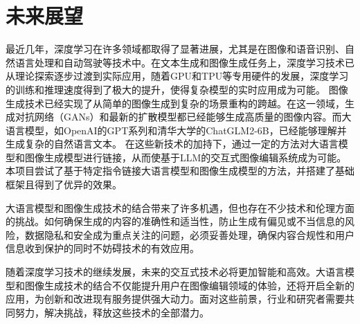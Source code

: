 \documentclass[a4paper,AutoFakeBold,oneside,12pt]{book}
\begin{document}
\section{未来展望}
最近几年，深度学习在许多领域都取得了显著进展，尤其是在图像和语音识别、自然语言处理和自动驾驶等技术中。在文本生成和图像生成任务上，深度学习技术已从理论探索逐步过渡到实际应用，随着GPU和TPU等专用硬件的发展，深度学习的训练和推理速度得到了极大的提升，使得复杂模型的实时应用成为可能。
图像生成技术已经实现了从简单的图像生成到复杂的场景重构的跨越。在这一领域，生成对抗网络（GANs）和最新的扩散模型都已经能够生成高质量的图像内容。而大语言模型，如OpenAI的GPT系列和清华大学的ChatGLM2-6B，已经能够理解并生成复杂的自然语言文本。
在这些新技术的加持下，通过一定的方法对大语言模型和图像生成模型进行链接，从而使基于LLM的交互式图像编辑系统成为可能。
本项目尝试了基于特定指令链接大语言模型和图像生成模型的方法，并搭建了基础框架且得到了优异的效果。

大语言模型和图像生成技术的结合带来了许多机遇，但也存在不少技术和伦理方面的挑战。如何确保生成的内容的准确性和适当性，防止生成有偏见或不当信息的风险，数据隐私和安全成为重点关注的问题，必须妥善处理，确保内容合规性和用户信息收到保护的同时不妨碍技术的有效应用。

随着深度学习技术的继续发展，未来的交互式技术必将更加智能和高效。大语言模型和图像生成技术的结合不仅能提升用户在图像编辑领域的体验，还将开启全新的应用，为创新和改进现有服务提供强大动力。面对这些前景，行业和研究者需要共同努力，解决挑战，释放这些技术的全部潜力。



\end{document}
